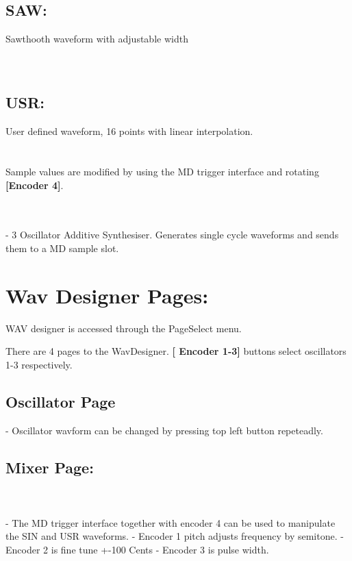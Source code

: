 \subsection{SAW:}Sawthooth waveform with adjustable width\\
\\\\
\subsection{USR:}User defined waveform, 16 points with linear interpolation.\\
\\\\
Sample values are modified by using the MD trigger interface and rotating \textbf{[Encoder 4]}.


\\\\


- 3 Oscillator Additive Synthesiser. Generates single cycle waveforms and sends
them to a MD sample slot.

\section{Wav Designer Pages:}
WAV designer is accessed through the PageSelect menu.

There are 4 pages to the WavDesigner. 
\textbf{[ Encoder 1-3]} buttons select oscillators 1-3 respectively.
\subsection{Oscillator Page}
- Oscillator wavform can be changed by pressing top left button repeteadly.

\subsection{Mixer Page:}
\\\\




- The MD trigger interface together with encoder 4 can be used to
manipulate the SIN and USR waveforms.
- Encoder 1 pitch adjusts frequency by semitone.
- Encoder 2 is fine tune +-100 Cents
- Encoder 3 is pulse width.

